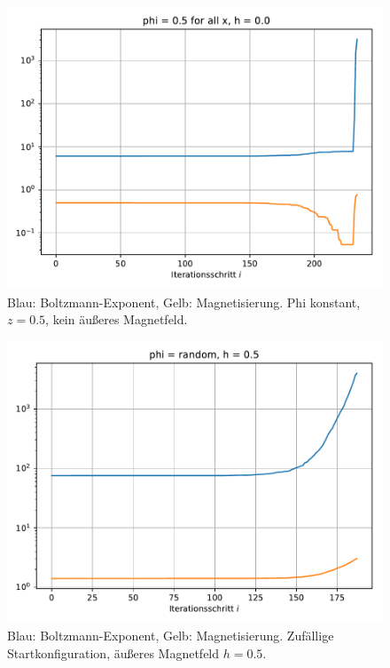 \documentclass[10pt,a4paper]{article}
\begin{document}
\begin{figure}[H]
  \centering
  \includegraphics[width=\textwidth]{../figures/phi_pt5_h_nil.pdf}
  \caption{Blau: Boltzmann-Exponent, Gelb: Magnetisierung. Phi konstant, $z=0.5$, kein äußeres Magnetfeld.}
\end{figure}

\begin{figure}[H]
  \centering
  \includegraphics[width=\textwidth]{../figures/phi_rand_h_pt5.pdf}
  \caption{Blau: Boltzmann-Exponent, Gelb: Magnetisierung. Zufällige Startkonfiguration, äußeres Magnetfeld $h=0.5$.}
\end{figure}
\end{document}

